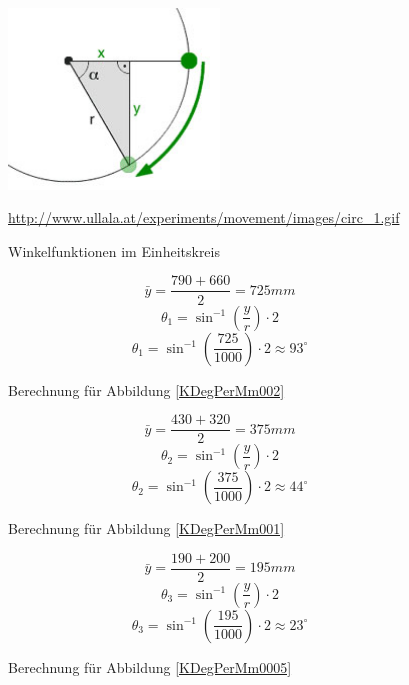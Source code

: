 \documentclass{article}
\begin{document}
\begin{figure}
  \centering
  \includegraphics[width=0.5\textwidth]{img/Winkelfunktionen_einheitskreis.jpg}               
  \caption{Winkelfunktionen im Einheitskreis }\url{http://www.ullala.at/experiments/movement/images/circ_1.gif}
  \label{Winkelfunktionen}
\end{figure}

\begin{figure}
	\begin{equation}\label{getY}	
		\bar{y}=\frac{790+660}{2}=725mm
	\end{equation}
	\begin{equation}\label{getX}	
		\theta_1=\sin^{-1} \left( \frac{y}{r} \right) \cdot 2
	\end{equation}
	\begin{equation}\label{theta1}	
		\theta_1=\sin^{-1}\left(\frac{725}{1000} \right) \cdot 2 \approx 93^\circ
	\end{equation}	
  \caption{Berechnung f\"ur Abbildung \ref{KDegPerMm002}}
  \label{KDegPerMm002Calc}
\end{figure}

\begin{figure}
	\begin{equation}\label{get001Y}	
		\bar{y}=\frac{430+320}{2}=375mm
	\end{equation}
	\begin{equation}\label{get001X}	
		\theta_2=\sin^{-1} \left( \frac{y}{r} \right) \cdot 2
	\end{equation}
	\begin{equation}\label{theta2}	
		\theta_2=\sin^{-1} \left( \frac{375}{1000} \right) \cdot 2 \approx 44^\circ
	\end{equation}	
  \caption{Berechnung f\"ur Abbildung \ref{KDegPerMm001}}
  \label{KDegPerMm001Calc}
\end{figure}

\begin{figure}
	\begin{equation}\label{get0005Y}	
		\bar{y}=\frac{190+200}{2}=195mm
	\end{equation}
	\begin{equation}\label{get0005X}	
		\theta_3=\sin^{-1} \left( \frac{y}{r} \right) \cdot 2
	\end{equation}
	\begin{equation}\label{theta3}	
		\theta_3=\sin^{-1} \left( \frac{195}{1000} \right) \cdot 2 \approx 23^\circ
	\end{equation}
  \caption{Berechnung f\"ur Abbildung \ref{KDegPerMm0005}}
  \label{KDegPerMm0005Calc}
\end{figure}
\end{document}
